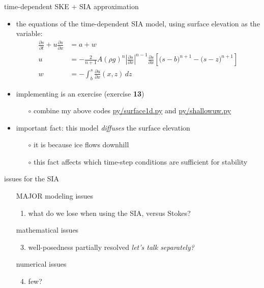 \documentclass[10pt,dvipsnames]{beamer}
\newcommand{\comm}[1]{{\footnotesize \hfill \emph{#1}}}
\begin{document}
\begin{frame}{time-dependent SKE $+$ SIA approximation}

\begin{itemize}
\item the equations of the \alert{time-dependent SIA model}, using surface elevation as the variable:
\begin{align*}
\frac{\partial s}{\partial t} + u \frac{\partial s}{\partial x} &= a + w \\
u &= - \frac{2}{n+1} A (\rho g)^n \left|\frac{\partial s}{\partial x}\right|^{n-1} \frac{\partial s}{\partial x} \left[\big(s - b\big)^{n+1} - \big(s-z\big)^{n+1}\right] \\
w &= - \int_{b}^{s} \frac{\partial u}{\partial x}(x,z)\,dz
\end{align*}
\item implementing is an exercise (exercise \textbf{13})
  \begin{itemize}
  \item[$\circ$] combine my above codes \href{https://github.com/bueler/mccarthy/blob/master/py/surace1d.py}{py/surface1d.py} and \href{https://github.com/bueler/mccarthy/blob/master/py/shallowuw.py}{py/shallowuw.py}
  \end{itemize}
\item important fact: \alert{this model \emph{diffuses} the surface elevation}
  \begin{itemize}
  \item[$\circ$] it is because ice flows downhill
  \item[$\circ$] this fact affects which time-step conditions are sufficient for stability
  \end{itemize}
\end{itemize}
\end{frame}


\begin{frame}{issues for the SIA}
\begin{itemize}
\item[] \alert{MAJOR modeling issues}
    \begin{enumerate}
    \item what do we lose when using the SIA, versus Stokes?
    \end{enumerate}
\item[] \alert{mathematical issues}
    \begin{enumerate}\setcounter{enumi}{2}
    \item well-posedness partially resolved \comm{let's talk separately?}
    \end{enumerate}
\item[] \alert{numerical issues}
    \begin{enumerate}\setcounter{enumi}{3}
    \item few?
    \end{enumerate}
\end{itemize}
\end{frame}
\end{document}
